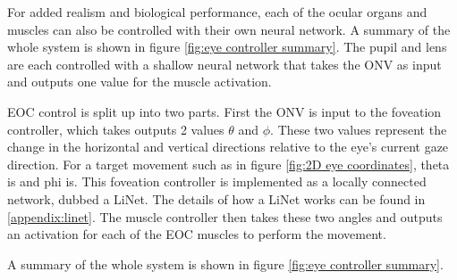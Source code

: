 \documentclass[../taasin.tex]{subfiles}
\begin{document}
For added realism and biological performance, each of the ocular organs and muscles can also be controlled with their own neural network. A summary of the whole system is shown in figure \ref{fig:eye controller summary}. The pupil and lens are each controlled with a shallow neural network that takes the ONV as input and outputs one value for the muscle activation.

EOC control is split up into two parts. First the ONV is input to the foveation controller, which takes outputs 2 values $\theta$ and $\phi$. These two values represent the change in the horizontal and vertical directions relative to the eye's current gaze direction. For a target movement such as in figure \ref{fig:2D eye coordinates}, theta is and phi is. This foveation controller is implemented as a locally connected network, dubbed a LiNet. The details of how a LiNet works can be found in \ref{appendix:linet}. The muscle controller then takes these two angles and outputs an activation for each of the EOC muscles to perform the movement.

A summary of the whole system is shown in figure \ref{fig:eye controller summary}.

\end{document}
